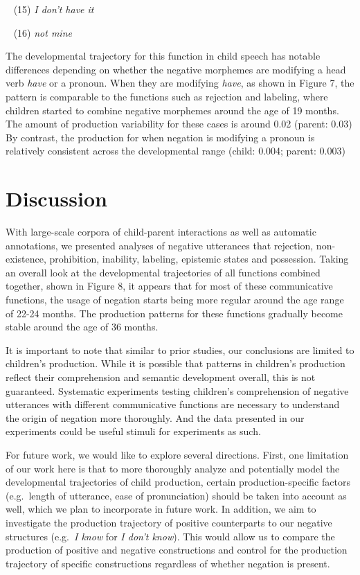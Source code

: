 \documentclass[10pt, letterpaper]{article}
\begin{document}
~ (15) \emph{I don't have it}

~ (16) \emph{not mine}

The developmental trajectory for this function in child speech has
notable differences depending on whether the negative morphemes are
modifying a head verb \emph{have} or a pronoun. When they are modifying
\emph{have}, as shown in Figure 7, the pattern is comparable to the
functions such as rejection and labeling, where children started to
combine negative morphemes around the age of 19 months. The amount of
production variability for these cases is around 0.02 (parent: 0.03) By
contrast, the production for when negation is modifying a pronoun is
relatively consistent across the developmental range (child: 0.004;
parent: 0.003)

\hypertarget{discussion}{%
\section{Discussion}\label{discussion}}

With large-scale corpora of child-parent interactions as well as
automatic annotations, we presented analyses of negative utterances that
rejection, non-existence, prohibition, inability, labeling, epistemic
states and possession. Taking an overall look at the developmental
trajectories of all functions combined together, shown in Figure 8, it
appears that for most of these communicative functions, the usage of
negation starts being more regular around the age range of 22-24 months.
The production patterns for these functions gradually become stable
around the age of 36 months.

It is important to note that similar to prior studies, our conclusions
are limited to children's production. While it is possible that patterns
in children's production reflect their comprehension and semantic
development overall, this is not guaranteed. Systematic experiments
testing children's comprehension of negative utterances with different
communicative functions are necessary to understand the origin of
negation more thoroughly. And the data presented in our experiments
could be useful stimuli for experiments as such.

For future work, we would like to explore several directions. First, one
limitation of our work here is that to more thoroughly analyze and
potentially model the developmental trajectories of child production,
certain production-specific factors (e.g.~length of utterance, ease of
pronunciation) should be taken into account as well, which we plan to
incorporate in future work. In addition, we aim to investigate the
production trajectory of positive counterparts to our negative
structures (e.g.~\emph{I know} for \emph{I don't know}). This would
allow us to compare the production of positive and negative
constructions and control for the production trajectory of specific
constructions regardless of whether negation is present.
\end{document}
